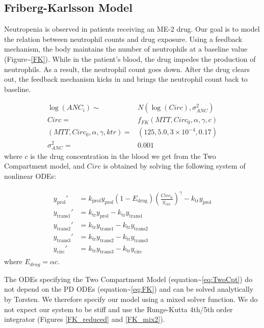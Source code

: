 \documentclass[11pt, reqno]{amsbook}
\numberwithin{section}{chapter}
\theoremstyle{remark}
\begin{document}
\subsection*{Friberg-Karlsson Model}
\label{sec:orgb118848}
Neutropenia is observed in patients receiving an ME-2 drug. Our goal
is to model the relation between neutrophil counts and drug
exposure. Using a feedback mechanism, the body maintains the number of
neutrophils at a baseline value (Figure\textasciitilde{}\ref{FK}). While in the
patient's blood, the drug impedes the production of neutrophils. As a
result, the neutrophil count goes down. After the drug clears out, the
feedback mechanism kicks in and brings the neutrophil count back to
baseline.

\begin{align}
  \log(ANC_i) \sim& N(\log(Circ), \sigma^2_{ANC})  \\
  Circ =& f_{FK}(MTT, Circ_{0}, \alpha, \gamma, c)  \\
  (MTT, Circ_{0}, \alpha, \gamma, ktr) =& (125, 5.0, 3 \times 10^{-4}, 0.17) \\
  \sigma^2_{ANC} =& 0.001
\end{align}
where \(c\) is the drug concentration in the blood we get from the Two
Compartment model, and \(Circ\) is obtained by solving the following
system of nonlinear ODEs:

\begin{eqnarray}
  \begin{aligned}
   y_\mathrm{prol}' &= k_\mathrm{prol} y_\mathrm{prol} (1 - E_\mathrm{drug})\left(\frac{Circ_0}{y_\mathrm{circ}}\right)^\gamma - k_\mathrm{tr}y_\mathrm{prol} \\
   y_\mathrm{trans1}' &= k_\mathrm{tr} y_\mathrm{prol} - k_\mathrm{tr} y_\mathrm{trans1} \\
   y_\mathrm{trans2}' &= k_\mathrm{tr} y_\mathrm{trans1} - k_\mathrm{tr} y_\mathrm{trans2}  \\
   y_\mathrm{trans3}' &= k_\mathrm{tr} y_\mathrm{trans2} - k_\mathrm{tr} y_\mathrm{trans3}  \\
   y_\mathrm{circ}' &= k_\mathrm{tr} y_\mathrm{trans3} - k_\mathrm{tr} y_\mathrm{circ}
   \end{aligned}
   \label{eq:FK}
\end{eqnarray}
where \(E_{drug}  = \alpha c\).

The ODEs specifying the Two Compartment Model
(equation\textasciitilde{}\ref{eq:TwoCpt}) do not depend on the PD ODEs
(equation\textasciitilde{}\ref{eq:FK}) and can be solved analytically by Torsten. We
therefore specify our model using a mixed solver function. We do not
expect our system to be stiff and use the Runge-Kutta 4th/5th order
integrator (Figures \ref{FK_reduced} and \ref{FK_mix2}).
\end{document}
